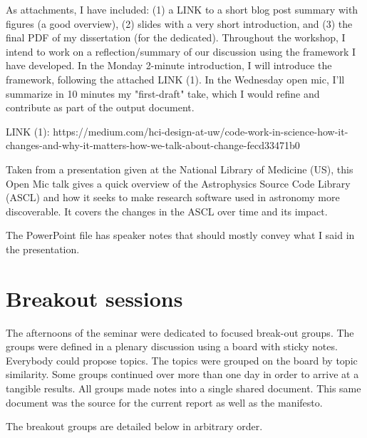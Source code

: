\documentclass[a4paper,UKenglish]{dagrep}
\begin{document}
As attachments, I have included: (1) a LINK to a short blog post summary with figures (a good overview), (2) slides with a very short introduction, and (3) the final PDF of my dissertation (for the dedicated). Throughout the workshop, I intend to work on a reflection/summary of our discussion using the framework I have developed. In the Monday 2-minute introduction, I will introduce the framework, following the attached LINK (1). In the Wednesday open mic, I'll summarize in 10 minutes my "first-draft" take, which I would refine and contribute as part of the output document.

LINK (1): https://medium.com/hci-design-at-uw/code-work-in-science-how-it-changes-and-why-it-matters-how-we-talk-about-change-fecd33471b0
 

Taken from a presentation given at the National Library of Medicine (US), this Open Mic talk gives a quick overview of the Astrophysics Source Code Library (ASCL) and how it seeks to make research software used in astronomy more discoverable. It covers the changes in the ASCL over time and its impact.

The PowerPoint file has speaker notes that should mostly convey what I said in the presentation.

\section{Breakout sessions}

The afternoons of the seminar were dedicated to focused break-out groups. The groups were defined in a plenary discussion using a board with sticky notes. Everybody could propose topics. The topics were grouped on the board by topic similarity. Some groups continued over more than one day in order to arrive at a tangible results. All groups made notes into a single shared document. This same document was the source for the current report as well as the manifesto. 

The breakout groups are detailed below in arbitrary order.


\end{document}
